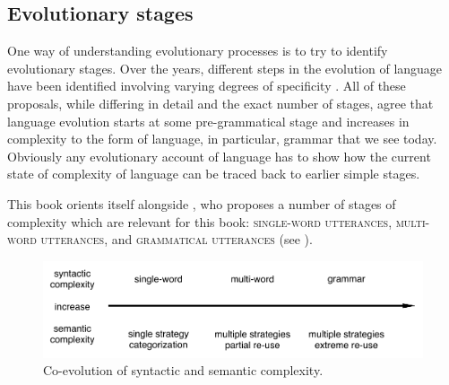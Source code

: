 \subsection{Evolutionary stages}
\label{s:stages}
One way of understanding evolutionary processes is to try to identify
evolutionary stages. Over the years, different steps in the evolution
of language have been identified involving varying degrees of 
specificity \citep{bickerton1999language,jackendoff1999possible,steels2005emergence}. 
All of these proposals, while differing in detail and the exact number of stages,
agree that language evolution starts at some pre-grammatical stage and 
increases in complexity to the form of language, in particular, grammar 
that we see today. Obviously any evolutionary account of language has to show how 
the current state of complexity of language can be traced back to earlier simple stages. 

This book orients itself alongside \cite{steels2005emergence}, who proposes
a number of stages of complexity which are relevant for this book:
\textsc{single-word utterances}, \textsc{multi-word utterances}, and \textsc{grammatical utterances}
(see ). 

\begin{figure}
	\includegraphics[width=.7\columnwidth]{figs/co-evolution-complexity}
	\caption[Co-evolution of syntactic and semantic complexity.]{Co-evolution of syntactic and semantic complexity.}
	\label{f:co-evolution-complexity}
\end{figure}
 
